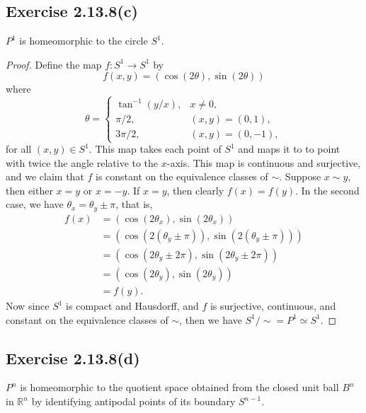 \documentclass[12pt]{article}
\newenvironment{problem}
    {\begin{lrbox}{\mybox}\begin{minipage}{\textwidth-10pt}}
    {\end{minipage}\end{lrbox}\framebox[6.5in]{\usebox{\mybox}}}
\newcommand{\R}{\mathbb{R}}
\begin{document}
\subsection*{Exercise 2.13.8(c)}
\begin{problem}
    $P^1$ is homeomorphic to the circle $S^1$.
\end{problem}

\begin{proof}
    Define the map $f:S^1\to S^1$ by
    \[f(x,y) = (\cos(2\theta), \sin(2\theta))\]
    where
    \[\theta =
        \begin{cases}
            \tan^{-1}(y/x), &x\ne0, \\
            \pi/2, &(x,y)=(0,1), \\
            3\pi/2, &(x,y)=(0,-1),
        \end{cases}
    \]
    for all $(x,y)\in S^1$. This map takes each point of $S^1$ and maps it to to point with twice the angle relative to the $x$-axis. This map is continuous and surjective, and we claim that $f$ is constant on the equivalence classes of $\sim$. Suppose $x\sim y$, then either $x=y$ or $x=-y$. If $x=y$, then clearly $f(x)=f(y)$. In the second case, we have $\theta_x=\theta_y\pm\pi$, that is,
    \begin{align*}
        f(x)
            &= (\cos(2\theta_x),\sin(2\theta_x)) \\
            &= (\cos(2(\theta_y\pm\pi)),\sin(2(\theta_y\pm\pi))) \\
            &= (\cos(2\theta_y\pm2\pi),\sin(2\theta_y\pm2\pi)) \\
            &= (\cos(2\theta_y),\sin(2\theta_y)) \\
            &= f(y).
    \end{align*}
    Now since $S^1$ is compact and Hausdorff, and $f$ is surjective, continuous, and constant on the equivalence classes of $\sim$, then we have $S^1/\sim=P^1\simeq S^1$.
    
\end{proof}

\subsection*{Exercise 2.13.8(d)}
\begin{problem}
    $P^n$ is homeomorphic to the quotient space obtained from the closed unit ball $B^n$ in $\R^n$ by identifying antipodal points of its boundary $S^{n-1}$.
\end{problem}
\end{document}
